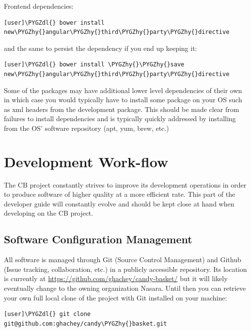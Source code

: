 \documentclass[letterpaper,10pt,english]{sphinxmanual}
\def\PYGZdl{\char`\$}
\def\PYGZhy{\char`\-}
\begin{document}
Frontend dependencies:

\begin{Verbatim}[commandchars=\\\{\}]
[user]\PYGZdl{} bower install new\PYGZhy{}angular\PYGZhy{}third\PYGZhy{}party\PYGZhy{}directive
\end{Verbatim}

and the same to persist the dependency if you end up keeping it:

\begin{Verbatim}[commandchars=\\\{\}]
[user]\PYGZdl{} bower install \PYGZhy{}\PYGZhy{}save new\PYGZhy{}angular\PYGZhy{}third\PYGZhy{}party\PYGZhy{}directive
\end{Verbatim}

Some of the packages may have additional lower level dependencies of
their own in which case you would typically have to install some
package on your OS such as xml headers from the development
package. This should be made clear from failures to install
dependencies and is typically quickly addressed by installing from the
OS' software repository (apt, yum, brew, etc.)


\section{Development Work-flow}
\label{developer-guide:development-work-flow}
The CB project constantly strives to improve its development
operations in order to produce software of higher quality at a more
efficient rate. This part of the developer guide will constantly
evolve and should be kept close at hand when developing on the CB
project.


\subsection{Software Configuration Management}
\label{developer-guide:software-configuration-management}
All software is managed through Git (Source Control Management) and
Github (Issue tracking, collaboration, etc.) in a publicly accessible
repository. Its location is currently at
\href{https://github.com/ghachey/candy-basket/}{https://github.com/ghachey/candy-basket/} but it will likely
eventually change to the owning organization Nasara. Until then you
can retrieve your own full local clone of the project with Git
installed on your machine:

\begin{Verbatim}[commandchars=\\\{\}]
[user]\PYGZdl{} git clone git@github.com:ghachey/candy\PYGZhy{}basket.git
\end{Verbatim}
\end{document}
